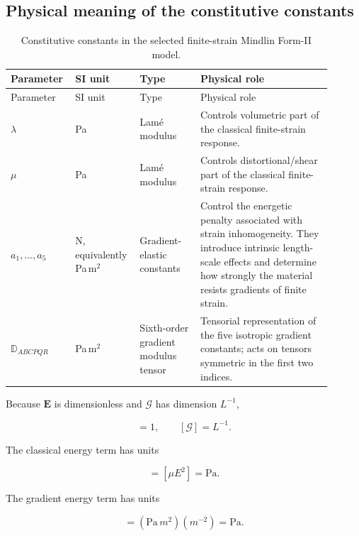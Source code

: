 \documentclass[11pt]{article}
\begin{document}
\subsection{Physical meaning of the constitutive constants}

\begin{longtable}[c]{>{\raggedright\arraybackslash}p{0.15\linewidth}
>{\raggedright\arraybackslash}p{0.18\linewidth}
>{\raggedright\arraybackslash}p{0.18\linewidth}
>{\raggedright\arraybackslash}p{0.39\linewidth}}
\caption{Constitutive constants in the selected finite-strain Mindlin Form-II model.}
\label{tab:sec2_constitutive_constants}\\
\toprule
Parameter & SI unit & Type & Physical role \\
\midrule
\endfirsthead
\toprule
Parameter & SI unit & Type & Physical role \\
\midrule
\endhead
$\lambda$ & Pa & Lam\'{e} modulus & Controls volumetric part of the classical finite-strain response. \\
$\mu$ & Pa & Lam\'{e} modulus & Controls distortional/shear part of the classical finite-strain response. \\
$a_1,\ldots,a_5$ & N, equivalently Pa\,m$^2$ & Gradient-elastic constants & Control the energetic penalty associated with strain inhomogeneity. They introduce intrinsic length-scale effects and determine how strongly the material resists gradients of finite strain. \\
$\mathbb{D}_{ABCPQR}$ & Pa\,m$^2$ & Sixth-order gradient modulus tensor & Tensorial representation of the five isotropic gradient constants; acts on tensors symmetric in the first two indices. \\
\bottomrule
\end{longtable}

Because $\mathbf{E}$ is dimensionless and $\bm{\mathcal{G}}$ has dimension $L^{-1}$,

\begin{equation}
[\mathbf{E}]=1,
\qquad
[\bm{\mathcal{G}}]=L^{-1}.
\label{eq:sec2_state_dimensions}
\end{equation}

The classical energy term has units

\begin{equation}
[\lambda E^2]=[\mu E^2]=\mathrm{Pa}.
\label{eq:sec2_classical_units}
\end{equation}

The gradient energy term has units

\begin{equation}
[a_i\mathcal{G}^2]
=
(\mathrm{Pa}\,m^2)(m^{-2})
=
\mathrm{Pa}.
\label{eq:sec2_gradient_units}
\end{equation}
\end{document}
